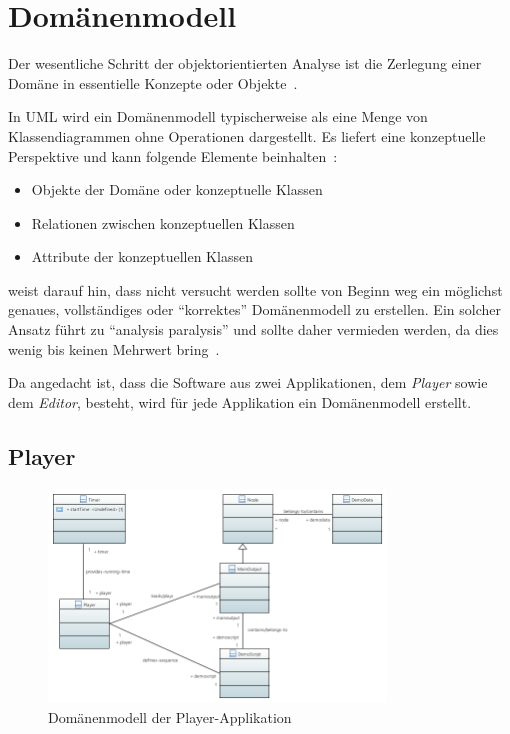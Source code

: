 
\section{Domänenmodell}
\label{sec:domain-model}

Der wesentliche Schritt der objektorientierten Analyse ist die Zerlegung einer
Domäne in essentielle Konzepte oder Objekte~\cite[S. 134]{larman_applying_2004}.

In UML wird ein Domänenmodell typischerweise als eine Menge von
Klassendiagrammen ohne Operationen dargestellt. Es liefert eine konzeptuelle
Perspektive und kann folgende Elemente beinhalten~\cite[S. 134]{larman_applying_2004}:
\begin{itemize}
    \item{Objekte der Domäne oder konzeptuelle Klassen}
    \item{Relationen zwischen konzeptuellen Klassen}
    \item{Attribute der konzeptuellen Klassen}
\end{itemize}

\citeauthor{larman_applying_2004} weist darauf hin, dass nicht versucht werden
sollte von Beginn weg ein möglichst genaues, vollständiges oder ``korrektes''
Domänenmodell zu erstellen. Ein solcher Ansatz führt zu ``analysis paralysis''
und sollte daher vermieden werden, da dies wenig bis keinen Mehrwert
bring~\cite[S. 133]{larman_applying_2004}.

Da angedacht ist, dass die Software aus zwei Applikationen, dem
\textit{Player} sowie dem \textit{Editor}, besteht, wird für jede
Applikation ein Domänenmodell erstellt.

\subsection{Player}
\label{subsec:domain-model:player}

\begin{figure}[H]
    \centering
    \includegraphics[width=0.8\textwidth]{img/player_domain_model.png}
    \caption{Domänenmodell der
        Player-Applikation\protect\footnotemark}\label{fig:domain-model:player}
\end{figure}

